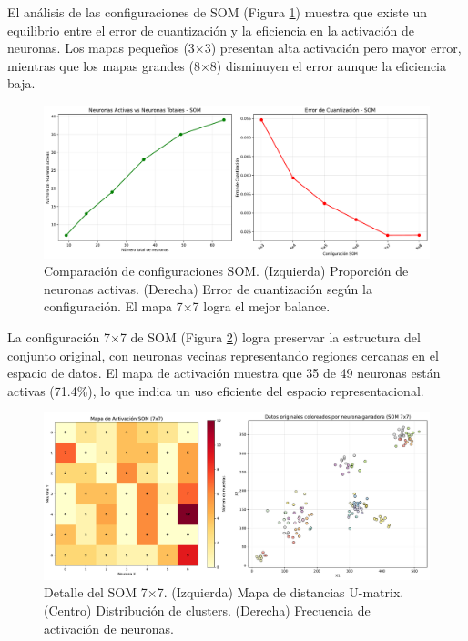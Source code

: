 \documentclass[12pt,a4paper]{article}
\begin{document}
El análisis de las configuraciones de SOM (Figura \ref{fig:som_configuraciones}) muestra que existe un equilibrio entre el error de cuantización y la eficiencia en la activación de neuronas. Los mapas pequeños (3×3) presentan alta activación pero mayor error, mientras que los mapas grandes (8×8) disminuyen el error aunque la eficiencia baja.

\begin{figure}[H]
    \centering
    \includegraphics[width=\textwidth]{figures/figura_04_analisis_som_configuraciones.pdf}
    \caption{Comparación de configuraciones SOM. (Izquierda) Proporción de neuronas activas. (Derecha) Error de cuantización según la configuración. El mapa 7×7 logra el mejor balance.}
    \label{fig:som_configuraciones}
\end{figure}

La configuración 7×7 de SOM (Figura \ref{fig:som_optimo}) logra preservar la estructura del conjunto original, con neuronas vecinas representando regiones cercanas en el espacio de datos. El mapa de activación muestra que 35 de 49 neuronas están activas (71.4\%), lo que indica un uso eficiente del espacio representacional.

\begin{figure}[H]
    \centering
    \includegraphics[width=\textwidth]{figures/figura_05_som_optimo_detallado.pdf}
    \caption{Detalle del SOM 7×7. (Izquierda) Mapa de distancias U-matrix. (Centro) Distribución de clusters. (Derecha) Frecuencia de activación de neuronas.}
    \label{fig:som_optimo}
\end{figure}
\end{document}
